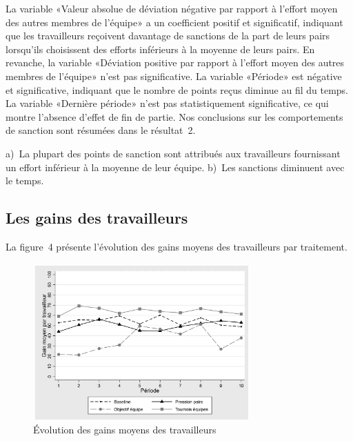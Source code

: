 \begin{Article}
\begin{refsection}[Lebourges]
La variable «Valeur absolue de déviation négative par rapport à
l'effort moyen des autres membres de l'équipe» a un coefficient positif
et significatif, indiquant que les travailleurs reçoivent davantage de
sanctions de la part de leurs pairs lorsqu'ils choisissent des efforts
inférieurs à la moyenne de leurs pairs. En revanche, la variable
«Déviation positive par rapport à l'effort moyen des autres membres de
l'équipe» n'est pas significative. La variable «Période» est négative
et significative, indiquant que le nombre de points reçus diminue au fil
du temps. La variable «Dernière période» n'est pas statistiquement
significative, ce qui montre l'absence d'effet de fin de partie. Nos
conclusions sur les comportements de sanction sont résumées dans le
résultat~2.

\vspace{.2cm}
\begin{resultat}
a)~La plupart des points de sanction sont attribués
aux travailleurs fournissant un effort inférieur à la moyenne de leur
équipe. b)~Les sanctions diminuent avec le temps. 
\end{resultat}

\newpage

\subsection{Les gains des travailleurs}

La figure~4 présente l'évolution des gains moyens des travailleurs
par traitement.

\begin{figure}[h]
    \centering
    \caption{Évolution des gains moyens des travailleurs}
    \includegraphics[height=6cm]{05_graph4.png}
\end{figure}


\end{refsection}
\end{Article}
